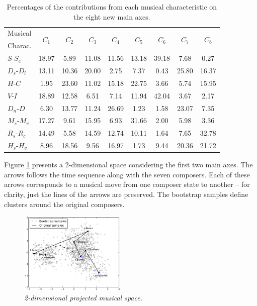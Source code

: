 \documentclass[
 aip,
 jmp,
 amsmath,amssymb,
 reprint,
]{revtex4-1}
\begin{document}
\begin{table}[ht]
\caption{\label{tab:Deviates}Percentages of
the contributions from each musical characteristic on the eight
new main axes.}

\begin{tabular}{|l||c|c|c|c|c|c|c|c|}
\hline
Musical         & \multirow{2}{*}{$C_1$} & \multirow{2}{*}{$C_2$} & \multirow{2}{*}{$C_3$} & \multirow{2}{*}{$C_4$} & \multirow{2}{*}{$C_5$} & \multirow{2}{*}{$C_6$} & \multirow{2}{*}{$C_7$} & \multirow{2}{*}{$C_8$}\\
Charac. & & & & & & & & \\
\hline
 $S$-$S_c$              &  18.97  &   5.89  & 11.08 & 11.56 &  13.18  &  39.18  &  7.68 &  0.27 \\
 $D_s$-$D_l$              &  13.11  &  10.36  & 20.00 &  2.75 &   7.37  &   0.43  & 25.80 & 16.37 \\
 $H$-$C$              &   1.95  &  23.60  & 11.02 & 15.18 &  22.75  &   3.66  &  5.74 & 15.95 \\
 $V$-$I$              &  18.89  &  12.58  &  6.51 &  7.14 &  11.94  &  42.04  &  3.67 &  2.17 \\
 $D_n$-$D$              &   6.30  &  13.77  & 11.24 & 26.69 &   1.23  &   1.58  & 23.07 &  7.35 \\
 $M_s$-$M_v$              &  17.27  &   9.61  & 15.95 &  6.93 &  31.66  &   2.00  &  5.98 &  3.36 \\
 $R_s$-$R_c$              &  14.49  &   5.58  & 14.59 & 12.74 &  10.11  &   1.64  &  7.65 & 32.78 \\
 $H_s$-$H_v$              &   8.96  &  18.56  &  9.56 & 16.97 &   1.73  &   9.44  & 20.36 & 21.72 \\
\hline
\end{tabular}
\end{table}

Figure \ref{fig:pca} presents a 2-dimensional space considering the
first two main axes. The arrows follows the time sequence along with the seven
composers. Each of these arrows corresponds to a musical move from one
composer state to another -- for clarity, just the lines of the arrows
are preserved. The bootstrap
samples define clusters around the original
composers.

\begin{figure}[htbp]
  \begin{center}
    \includegraphics[width=0.45\textwidth]{g1}
  \end{center}
  \caption{\it 2-dimensional projected musical space.}
  \label{fig:pca}
\end{figure}
\end{document}
